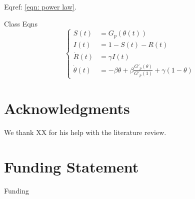 \documentclass[12pt]{article}
\theoremstyle{plain}
\theoremstyle{definition}
\begin{document}
Eqref: \eqref{eqn: power law}.

Class Eqns
\begin{equation}
	\label{eqn: CM ODE}
	\begin{cases}
		S(t) & = G_p(\theta(t)) \\
		I(t) & = 1-S(t)-R(t) \\
		\dot{R}(t) & = \gamma I(t) \\
		\dot{\theta}(t) & = -\beta \theta +\beta \frac{G'_p(\theta)}{G'_p(1)}+\gamma (1-\theta)
	\end{cases} 
\end{equation}

\section*{Acknowledgments}
We thank XX for his help with the literature review. 

\section*{Funding Statement}
Funding

\newpage



\newpage

\end{document}
